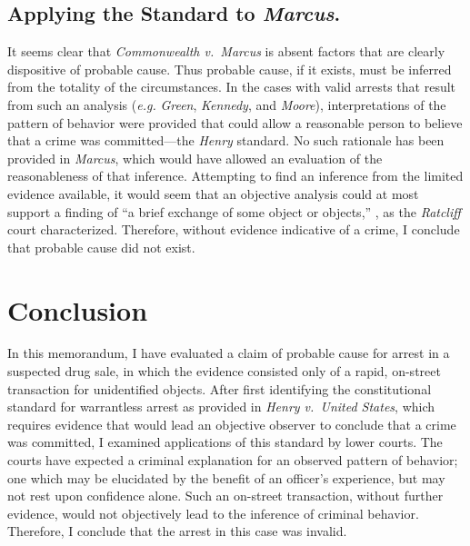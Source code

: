 \documentclass[12pt]{lawmemo}
\begin{document}
\subsection{Applying the Standard to \textit{Marcus}.} It seems clear that
\textit{Commonwealth v.\ Marcus} is absent factors that are clearly dispositive of
probable cause.  Thus probable cause, if it exists, must be inferred from the
totality of the circumstances.  In the cases with valid arrests that result from
such an analysis (\textit{e.g.} \textit{Green}, \textit{Kennedy}, and
\textit{Moore}), interpretations of the pattern of behavior were provided that
could allow a reasonable person to believe that a crime was committed---the
\textit{Henry} standard.  No such rationale has been provided
in \textit{Marcus}, which would have allowed an evaluation of the
reasonableness of that inference.  Attempting to find an inference from the
limited evidence available, it would seem that an objective analysis could at
most support a finding of ``a brief exchange of some object or
objects,'' , as the \textit{Ratcliff} court
characterized.  Therefore, without evidence indicative of a crime, I conclude
that probable cause did not exist.

\section{Conclusion} In this memorandum, I have evaluated a claim of probable
cause for arrest in a suspected drug sale, in which the evidence consisted only
of a rapid, on-street transaction for unidentified objects.  After first
identifying the constitutional standard for warrantless arrest as provided in
\textit{Henry v.\ United States}, which requires evidence that would lead an
objective observer to conclude that a crime was committed, I examined
applications of this standard by lower courts.  The courts have expected a
criminal explanation for an observed pattern of behavior; one which may be
elucidated by the benefit of an officer's experience, but may not rest upon
confidence alone.  Such an on-street transaction, without further evidence,
would not objectively lead to the inference of criminal behavior.  Therefore, I conclude that the
arrest in this case was invalid.
\end{document}
